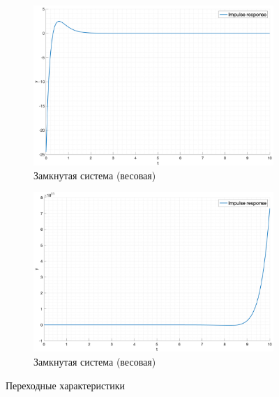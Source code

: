 \begin{figure}[ht!]
\begin{subfigure}{0.5\textwidth}
        \includegraphics[width=\textwidth]{media/plots/task2_impulse_response_open.png}
        \caption{Замкнутая система (весовая)}
        \label{fig:task2_impulse:open}
    \end{subfigure}%
    \begin{subfigure}{0.5\textwidth}
        \includegraphics[width=\textwidth]{media/plots/task2_impulse_response_closed.png}
        \caption{Замкнутая система (весовая)}
        \label{fig:task2_impulse:closed}
    \end{subfigure}
    \caption{Переходные характеристики}
    \label{fig:task2_respoces}
\end{figure}

